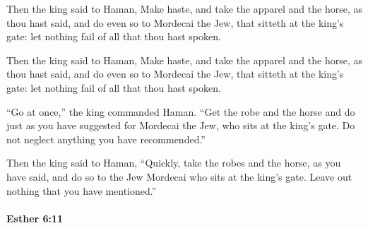 			Then the king said to Haman, Make haste, and take the apparel and the horse, as thou hast said, and do even so to Mordecai the Jew, that sitteth at the king’s gate: let nothing fail of all that thou hast spoken.

			\begin{versebox}
					\item[BHS] 
					\item[LXX] 
					\item[ASV] Then the king said to Haman, Make haste, and take the apparel and the horse, as thou hast said, and do even so to Mordecai the Jew, that sitteth at the king's gate: let nothing fail of all that thou hast spoken.
					\item[NIV] “Go at once,” the king commanded Haman. “Get the robe and the horse and do just as you have suggested for Mordecai the Jew, who sits at the king’s gate. Do not neglect anything you have recommended.”
					\item[NRSV] Then the king said to Haman, “Quickly, take the robes and the horse, as you have said, and do so to the Jew Mordecai who sits at the king’s gate. Leave out nothing that you have mentioned.”
			\end{versebox}

		\paragraph{Esther 6:11} %
			\label{ESTHER-6-11}

